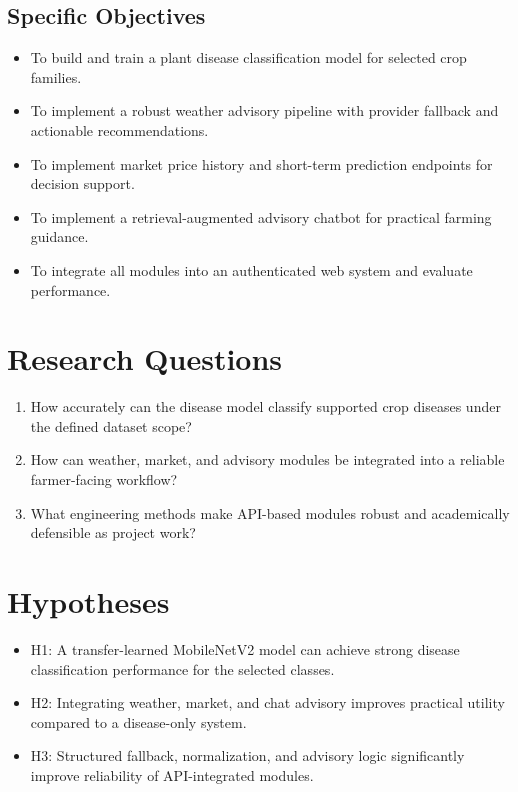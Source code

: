 \documentclass[12pt,a4paper]{report}
\begin{document}
\subsection{Specific Objectives}
\begin{itemize}[noitemsep]
    \item To build and train a plant disease classification model for selected crop families.
    \item To implement a robust weather advisory pipeline with provider fallback and actionable recommendations.
    \item To implement market price history and short-term prediction endpoints for decision support.
    \item To implement a retrieval-augmented advisory chatbot for practical farming guidance.
    \item To integrate all modules into an authenticated web system and evaluate performance.
\end{itemize}

\section{Research Questions}
\begin{enumerate}[noitemsep]
    \item How accurately can the disease model classify supported crop diseases under the defined dataset scope?
    \item How can weather, market, and advisory modules be integrated into a reliable farmer-facing workflow?
    \item What engineering methods make API-based modules robust and academically defensible as project work?
\end{enumerate}

\section{Hypotheses}
\begin{itemize}[noitemsep]
    \item H1: A transfer-learned MobileNetV2 model can achieve strong disease classification performance for the selected classes.
    \item H2: Integrating weather, market, and chat advisory improves practical utility compared to a disease-only system.
    \item H3: Structured fallback, normalization, and advisory logic significantly improve reliability of API-integrated modules.
\end{itemize}
\end{document}

